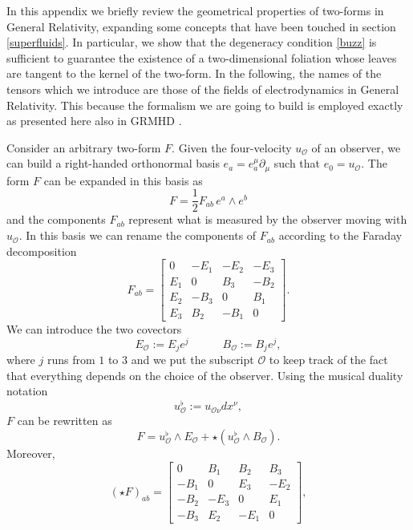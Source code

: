 \documentclass[usenatbib%
]{mnras}
\newcommand{\spc}{\quad \quad \quad}
\begin{document}
In this appendix we briefly review the geometrical properties of two-forms in General Relativity, expanding some concepts that have been touched in section \ref{superfluids}. In particular, we show that the degeneracy condition \eqref{buzz} is sufficient to guarantee the existence of a two-dimensional foliation whose leaves are tangent to the kernel of the two-form. 
In the following, the names of the tensors which we introduce are those of the fields of electrodynamics in General Relativity. This because the formalism we are going to build is employed exactly as presented here also in GRMHD \citep{special_in_gen,Gralla_jacobson2014}.
 

Consider an arbitrary two-form $F$. Given the four-velocity $u_{\mathcal{O}}$ of an observer, we can build a right-handed orthonormal basis $e_a=e_a^\mu \partial_\mu$ such that $e_0 =u_{\mathcal{O}}$. The form $F$ can be expanded in this basis as
\begin{equation}
F = \dfrac{1}{2} F_{ab} \, e^a \wedge e^b 
\end{equation}
and the components $F_{ab}$ represent what is measured by the observer moving with $u_{\mathcal{O}}$. In this basis we can rename the components of  $F_{ab}$ according to the Faraday decomposition
\begin{equation}
F_{ab} = 
\begin{bmatrix}
  0  & -E_1 &  -E_2 &  -E_3  \\
   E_1 & 0 & B_3 & -B_2  \\
   E_2 & -B_3 & 0 & B_1  \\
   E_3 & B_2 & -B_1 & 0
\end{bmatrix}.
\end{equation}
We can introduce the two covectors
\begin{equation}
E_{\mathcal{O}} := E_j e^j  \spc  B_{\mathcal{O}} := B_j e^j,
\end{equation}
where $j$ runs from $1$ to $3$ and we put the subscript ${\mathcal{O}}$ to keep track of the fact that everything depends on the choice of the observer. Using the musical duality notation
\begin{equation}
u_{\mathcal{O}}^\flat := u_{{\mathcal{O}}\nu} dx^\nu ,
\end{equation}
$F$ can be rewritten as
\begin{equation}\label{impressioanante_1}
F = u_{\mathcal{O}}^\flat \wedge E_{\mathcal{O}} + \star(u_{\mathcal{O}}^\flat \wedge B_{\mathcal{O}}).
\end{equation}
Moreover, 
\begin{equation}
(\star F)_{ab} = 
\begin{bmatrix}
  0  & B_1 &  B_2 &  B_3  \\
   -B_1 & 0 & E_3 & -E_2  \\
   -B_2 & -E_3  & 0 & E_1  \\
   -B_3 & E_2 & -E_1 & 0
\end{bmatrix},
\end{equation}
\end{document}
